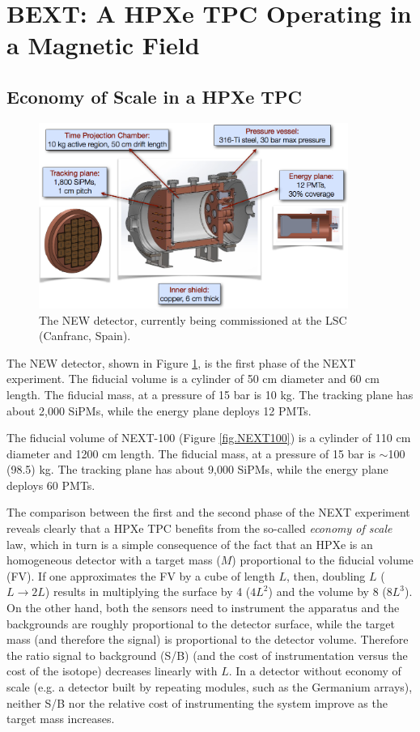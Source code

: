 \section{BEXT: A HPXe TPC Operating in a Magnetic Field}

\subsection{Economy of Scale in a HPXe TPC}

\begin{figure}
\centering
\includegraphics[width=0.9\textwidth]{img/NEW.png}
\caption{\small The NEW detector, currently being commissioned at the LSC (Canfranc, Spain).} \label{fig.NEW}
\end{figure}

The NEW detector, shown in Figure \ref{fig.NEW}, is the first phase of the NEXT experiment. The fiducial volume is a cylinder of 50 cm diameter and 60 cm length. The fiducial mass, at a pressure of 15 bar is 10 kg. The tracking plane has about 2,000 SiPMs, while the energy plane deploys 12 PMTs.

The fiducial volume of NEXT-100 (Figure \ref{fig.NEXT100}) is a cylinder of 110 cm diameter and 1200 cm length. The fiducial mass, at a pressure of 15 bar is $\sim$100 (98.5) kg. The tracking plane has about 9,000 SiPMs, while the energy plane deploys 60 PMTs.

The comparison between the first and the second phase of the NEXT experiment reveals clearly that a HPXe TPC benefits from the so-called {\em economy of scale} law, which in turn is a simple consequence of the fact that an HPXe is an homogeneous detector with a target mass ($M$) proportional to the fiducial volume (FV). If one approximates the FV by a cube of length $L$, then, doubling $L$ ($L \rightarrow 2 L$) results in multiplying the surface by 4 ($4 L^2$) and the volume by 8 ($8 L^3$). On the other hand, both the sensors need to instrument the apparatus and the backgrounds are roughly proportional to the detector surface, while the target mass (and therefore the signal) is proportional to the detector volume. Therefore the ratio signal to background (S/B) (and the cost of instrumentation versus the cost of the isotope) decreases linearly with $L$. In a detector without economy of scale (e.g. a detector built by repeating modules, such as the Germanium arrays), neither S/B nor the relative cost of instrumenting the system improve as the target mass increases. 

